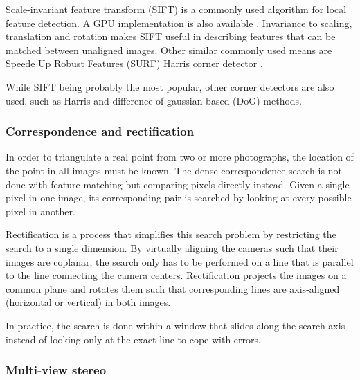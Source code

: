 Scale-invariant feature transform (SIFT) \cite{lowe1999object} is a commonly used algorithm for local feature detection. A GPU implementation is also available \cite{changchang2007siftgpu}.  Invariance to scaling, translation and rotation makes SIFT useful in describing features that can be matched between unaligned images. Other similar commonly used means are Speede Up Robust Features (SURF) \cite{bay2006surf} Harris corner detector \cite{harris1988combined}.

While SIFT being probably the most popular, other corner detectors are also used, such as Harris and difference-of-gaussian-based (DoG) methods.



\subsubsection{Correspondence and rectification} %


In order to triangulate a real point from two or more photographs, the location of the point in all images must be known.
The dense correspondence search is not done with feature matching but comparing pixels directly instead.
Given a single pixel in one image, its corresponding pair is searched by looking at every possible pixel in another.

Rectification is a process that simplifies this search problem by restricting the search to a single dimension.
By virtually aligning the cameras such that their images are coplanar, the search only has to be performed on a line that is parallel to the line connecting the camera centers.
Rectification projects the images on a common plane and rotates them such that corresponding lines are axis-aligned (horizontal or vertical) in both images. \cite{hartley03multiview}

In practice, the search is done within a window that slides along the search axis instead of looking only at the exact line to cope with errors.



\subsubsection{Multi-view stereo} %

